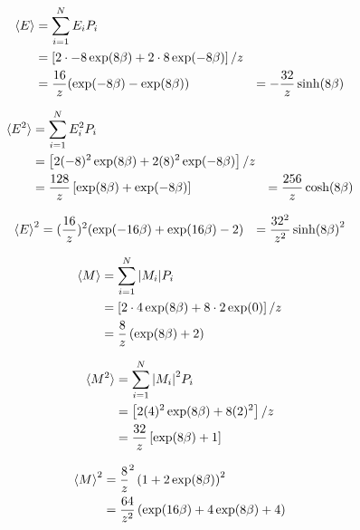 \begin{align}
  \braket{E} &= \sum_{i=1}^{N} E_i P_i \\
             &= \left[2 \cdot -8 \exp(8\beta) + 2\cdot 8 \exp(-8\beta)\right] / z \\
             &= \frac{16}{z} ( \exp(-8\beta) - \exp(8\beta))
             &= -\frac{32}{z} \sinh(8\beta)
\end{align}


\begin{align}
  \braket{E^2} &= \sum_{i=1}^{N} E_i^2 P_i \\
                &= \left[ 2 (-8)^2\exp(8\beta) + 2 (8)^2\exp(-8\beta) \right] /z \\
                &= \frac{128}{z}\left[ \exp(8 \beta) + \exp(-8\beta)\right]
                &= \frac{256}{z} \cosh(8\beta)
\end{align}

\begin{align}
  \braket{E}^2 &= (\frac{16}{z})^2 ( \exp(-16\beta) + \exp(16\beta) - 2)
               &= \frac{32^2}{z^2} \sinh(8\beta)^2
\end{align}

\begin{align}
  \braket{M} &= \sum_{i=1}^{N} \abs{M_i} P_i \\
             &= \left[2\cdot 4 \exp(8\beta ) + 8 \cdot 2 \exp(0)\right] / z \\
             &= \frac{8}{z} \left( \exp(8\beta) + 2\right)
\end{align}


\begin{align}
  \braket{M^2} &= \sum_{i=1}^{N} \abs{M_i}^2 P_i \\
               &= \left[2 (4)^2 \exp(8\beta) + 8 (2)^2\right] / z \\
               &= \frac{32}{z} \left[ \exp(8\beta) + 1 \right]
\end{align}

\begin{align}
  \braket{M}^2 &= \frac{8}{z}^2 \left( 1 + 2\exp(8\beta) \right)^2 \\
               &= \frac{64}{z^2} \left( \exp(16\beta) + 4\exp(8\beta) +  4\right)
\end{align}


%

%
%
%

